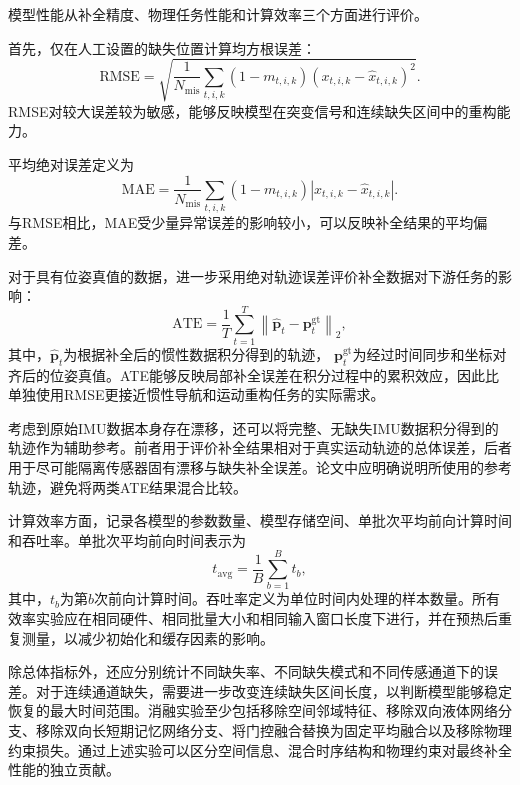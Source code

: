 模型性能从补全精度、物理任务性能和计算效率三个方面进行评价。

首先，仅在人工设置的缺失位置计算均方根误差：
\begin{equation}
    \mathrm{RMSE}
    =
    \sqrt{
    \frac{1}{N_{\mathrm{mis}}}
    \sum_{t,i,k}
    (1-m_{t,i,k})
    \left(
    x_{t,i,k}
    -
    \widehat{x}_{t,i,k}
    \right)^2
    }.
\end{equation}
RMSE对较大误差较为敏感，能够反映模型在突变信号和连续缺失区间中的重构能力。

平均绝对误差定义为
\begin{equation}
    \mathrm{MAE}
    =
    \frac{1}{N_{\mathrm{mis}}}
    \sum_{t,i,k}
    (1-m_{t,i,k})
    \left|
    x_{t,i,k}
    -
    \widehat{x}_{t,i,k}
    \right|.
\end{equation}
与RMSE相比，MAE受少量异常误差的影响较小，可以反映补全结果的平均偏差。

对于具有位姿真值的数据，进一步采用绝对轨迹误差评价补全数据对下游任务的影响：
\begin{equation}
    \mathrm{ATE}
    =
    \frac{1}{T}
    \sum_{t=1}^{T}
    \left\|
    \widehat{\boldsymbol{p}}_t
    -
    \boldsymbol{p}^{\mathrm{gt}}_t
    \right\|_2,
\end{equation}
其中，$\widehat{\boldsymbol{p}}_t$为根据补全后的惯性数据积分得到的轨迹，
$\boldsymbol{p}^{\mathrm{gt}}_t$为经过时间同步和坐标对齐后的位姿真值。ATE能够反映局部补全误差在积分过程中的累积效应，因此比单独使用RMSE更接近惯性导航和运动重构任务的实际需求。

考虑到原始IMU数据本身存在漂移，还可以将完整、无缺失IMU数据积分得到的轨迹作为辅助参考。前者用于评价补全结果相对于真实运动轨迹的总体误差，后者用于尽可能隔离传感器固有漂移与缺失补全误差。论文中应明确说明所使用的参考轨迹，避免将两类ATE结果混合比较。

计算效率方面，记录各模型的参数数量、模型存储空间、单批次平均前向计算时间和吞吐率。单批次平均前向时间表示为
\begin{equation}
    t_{\mathrm{avg}}
    =
    \frac{1}{B}
    \sum_{b=1}^{B}t_b,
\end{equation}
其中，$t_b$为第$b$次前向计算时间。吞吐率定义为单位时间内处理的样本数量。所有效率实验应在相同硬件、相同批量大小和相同输入窗口长度下进行，并在预热后重复测量，以减少初始化和缓存因素的影响。

除总体指标外，还应分别统计不同缺失率、不同缺失模式和不同传感通道下的误差。对于连续通道缺失，需要进一步改变连续缺失区间长度，以判断模型能够稳定恢复的最大时间范围。消融实验至少包括移除空间邻域特征、移除双向液体网络分支、移除双向长短期记忆网络分支、将门控融合替换为固定平均融合以及移除物理约束损失。通过上述实验可以区分空间信息、混合时序结构和物理约束对最终补全性能的独立贡献。

